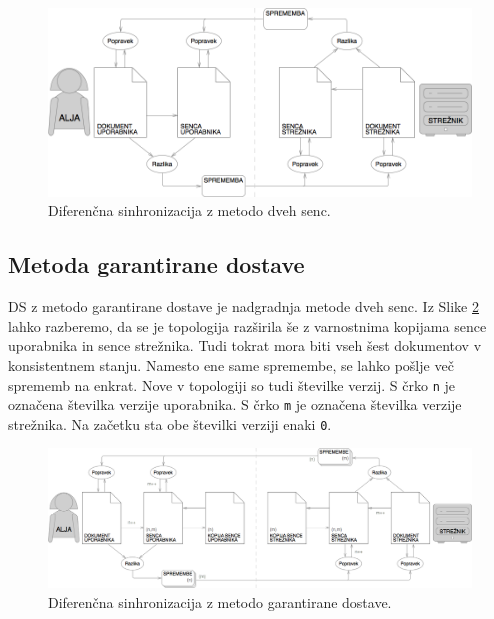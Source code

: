 \documentclass[a4paper, 12pt, twoside]{book}
\begin{document}
\begin{figure}[placement h]
\begin{center}
\includegraphics[width=11.83cm]{ds2.png}
\end{center}
\caption{Diferenčna sinhronizacija z metodo dveh senc.}
\label{ds2}
\end{figure}

\subsection{Metoda garantirane dostave}

DS z metodo garantirane dostave je nadgradnja metode dveh senc. Iz Slike \ref{ds3} lahko razberemo, da se je topologija razširila še z varnostnima kopijama sence uporabnika in sence strežnika. Tudi tokrat mora biti vseh šest dokumentov v konsistentnem stanju. Namesto ene same spremembe, se lahko pošlje več sprememb na enkrat. Nove v topologiji so tudi številke verzij. S črko {\tt n} je označena številka verzije uporabnika. S črko {\tt m} je označena številka verzije strežnika. Na začetku sta obe številki verziji enaki {\tt 0}.

\begin{figure}[placement h]
\begin{center}
\includegraphics[width=16cm]{ds3.png}
\end{center}
\caption{Diferenčna sinhronizacija z metodo garantirane dostave.}
\label{ds3}
\end{figure}
\end{document}
